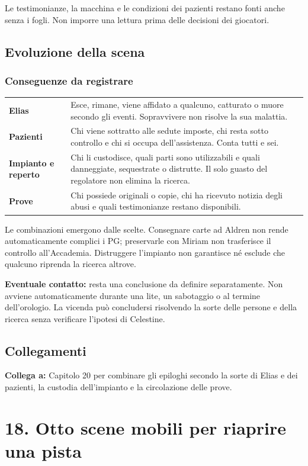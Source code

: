 \documentclass[11pt,a4paper]{article}
\newcommand{\linkto}[1]{\begin{routebox}\textbf{Collega a:} #1\end{routebox}}
\begin{document}
Le testimonianze, la macchina e le condizioni dei pazienti restano fonti anche senza i fogli. Non imporre una lettura prima delle decisioni dei giocatori.

\subsection{Evoluzione della scena}
\subsubsection{Conseguenze da registrare}
\begin{tabularx}{\linewidth}{>{\bfseries}p{29mm} X}
Elias & Esce, rimane, viene affidato a qualcuno, catturato o muore secondo gli eventi. Sopravvivere non risolve la sua malattia.\\
Pazienti & Chi viene sottratto alle sedute imposte, chi resta sotto controllo e chi si occupa dell'assistenza. Conta tutti e sei.\\
Impianto e reperto & Chi li custodisce, quali parti sono utilizzabili e quali danneggiate, sequestrate o distrutte. Il solo guasto del regolatore non elimina la ricerca.\\
Prove & Chi possiede originali o copie, chi ha ricevuto notizia degli abusi e quali testimonianze restano disponibili.\\
\end{tabularx}

Le combinazioni emergono dalle scelte. Consegnare carte ad Aldren non rende automaticamente complici i PG; preservarle con Miriam non trasferisce il controllo all'Accademia. Distruggere l'impianto non garantisce né esclude che qualcuno riprenda la ricerca altrove.



\textbf{Eventuale contatto:} resta una conclusione da definire separatamente. Non avviene automaticamente durante una lite, un sabotaggio o al termine dell'orologio. La vicenda può concludersi risolvendo la sorte delle persone e della ricerca senza verificare l'ipotesi di Celestine.

\subsection{Collegamenti}
\linkto{Capitolo 20 per combinare gli epiloghi secondo la sorte di Elias e dei pazienti, la custodia dell'impianto e la circolazione delle prove.}

\section{18. Otto scene mobili per riaprire una pista}
\end{document}
